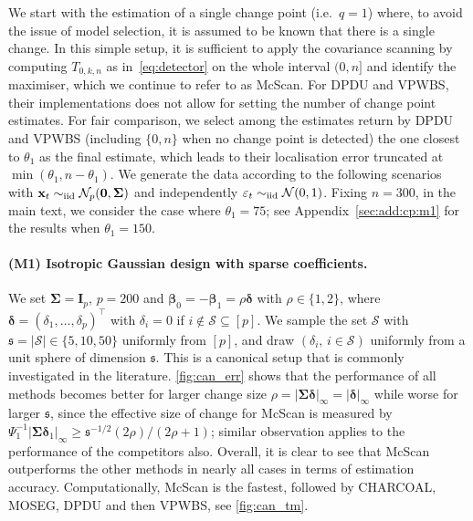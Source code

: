 \documentclass[11pt, a4paper]{article}
\newcommand{\mbf}{\mathbf}
\newcommand{\mc}{\mathcal}
\newcommand{\cp}{\theta}
\newcommand{\iid}{\text{\upshape iid}}
\theoremstyle{definition}
\theoremstyle{definition}
\theoremstyle{definition}
\theoremstyle{definition}
\theoremstyle{definition}
\theoremstyle{remark}
\theoremstyle{definition}
\theoremstyle{definition}
\theoremstyle{definition}
\begin{document}
We start with the estimation of a single change point (i.e.\ $q = 1$) where, to avoid the issue of model selection, it is assumed to be known that there is a single change. In this simple setup, it is sufficient to apply the covariance scanning by computing $T_{0, k, n}$ as in~\eqref{eq:detector} on the whole interval $(0, n]$ and identify the maximiser, which we continue to refer to as McScan. For DPDU and VPWBS, their implementations does not allow for setting the number of change point estimates. 
For fair comparison, we select among the estimates return by DPDU and VPWBS (including $\{0, n\}$ when no change point is detected) the one closest to $\cp_1$ as the final estimate, which leads to their localisation error truncated at $\min(\cp_1, n - \cp_1)$.
We generate the data according to the following scenarios with $\mbf x_t \sim_{\iid} \mc N_p(\mbf 0, \bm\Sigma)$ and independently $\varepsilon_t \sim_{\iid} \mathcal{N}(0, 1)$.
Fixing $n = 300$, in the main text, we consider the case where $\cp_1 = 75$; see Appendix~\ref{sec:add:cp:m1} for the results when $\cp_1 = 150$.

\paragraph{(M1) Isotropic Gaussian design with sparse coefficients.} 
We set $\bm\Sigma = \mbf I_p$, $p = 200$ 
and $\bm{\beta}_0 = -\bm{\beta}_1 = \rho \bm\delta$ with $\rho \in \{1, 2\}$, where $\bm\delta = (\delta_1, \ldots, \delta_p)^\top$ with $\delta_i = 0$ if $i \notin \mc S \subseteq [p]$.
We sample the set $\mc S$ with $\mathfrak{s} = \vert \mc S \vert \in \{5, 10, 50\}$ uniformly from $[p]$, and draw $(\delta_i, \, i \in \mc S)$ uniformly from a unit sphere of dimension $\mathfrak{s}$. 
This is a canonical setup that is commonly investigated in the literature. 
\cref{fig:can_err} shows that the performance of all methods becomes better for larger change size $\rho = \vert \bm\Sigma \bm\delta \vert_\infty = \vert \bm\delta \vert_\infty$ while worse for larger $\mathfrak{s}$, since the effective size of change for McScan is measured by $\Psi_1^{-1} \vert\bm\Sigma \bm\delta_1 \vert_{\infty} \ge  \mathfrak{s}^{-1/2} (2\rho)/(2\rho + 1)$; similar observation applies to the performance of the competitors also.
Overall, it is clear to see that McScan outperforms the other methods in nearly all cases in terms of estimation accuracy. 
Computationally, McScan is the fastest, followed by CHARCOAL, MOSEG, DPDU and then VPWBS, see \cref{fig:can_tm}.
\end{document}
